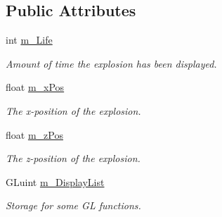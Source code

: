 \subsection*{Public Attributes}
\begin{DoxyCompactItemize}
\item 
\hypertarget{classExplosion_a51fb46b696e702198f158a267139e71b}{int \hyperlink{classExplosion_a51fb46b696e702198f158a267139e71b}{m\-\_\-\-Life}}\label{classExplosion_a51fb46b696e702198f158a267139e71b}

\begin{DoxyCompactList}\small\item\em Amount of time the explosion has been displayed. \end{DoxyCompactList}\item 
\hypertarget{classExplosion_a5991330a7a631ab270816c8815d99f8d}{float \hyperlink{classExplosion_a5991330a7a631ab270816c8815d99f8d}{m\-\_\-x\-Pos}}\label{classExplosion_a5991330a7a631ab270816c8815d99f8d}

\begin{DoxyCompactList}\small\item\em The x-\/position of the explosion. \end{DoxyCompactList}\item 
\hypertarget{classExplosion_ab28ac4451b32dbeb899c427f687e17df}{float \hyperlink{classExplosion_ab28ac4451b32dbeb899c427f687e17df}{m\-\_\-z\-Pos}}\label{classExplosion_ab28ac4451b32dbeb899c427f687e17df}

\begin{DoxyCompactList}\small\item\em The z-\/position of the explosion. \end{DoxyCompactList}\item 
\hypertarget{classExplosion_a4fb3a3b8ebc274e6f887c9f0597af817}{G\-Luint \hyperlink{classExplosion_a4fb3a3b8ebc274e6f887c9f0597af817}{m\-\_\-\-Display\-List}}\label{classExplosion_a4fb3a3b8ebc274e6f887c9f0597af817}

\begin{DoxyCompactList}\small\item\em Storage for some G\-L functions. \end{DoxyCompactList}\end{DoxyCompactItemize}
